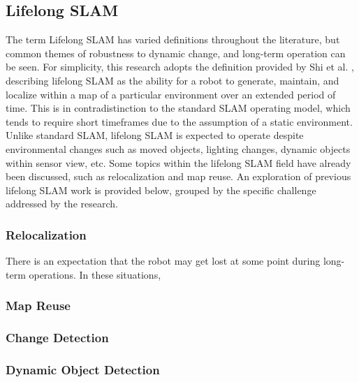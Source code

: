 \subsection{Lifelong SLAM}

The term Lifelong SLAM has varied definitions throughout the literature, but common themes of robustness to dynamic change, and long-term operation can be seen. For simplicity, this research adopts the definition provided by Shi et al. \cite{shiAreWeReady2020}, describing lifelong SLAM as the ability for a robot to generate, maintain, and localize within a map of a particular environment over an extended period of time. This is in contradistinction to the standard SLAM operating model, which tends to require short timeframes due to the assumption of a static environment. Unlike standard SLAM, lifelong SLAM is expected to operate despite environmental changes such as moved objects, lighting changes, dynamic objects within sensor view, etc. Some topics within the lifelong SLAM field have already been discussed, such as relocalization and map reuse. An exploration of previous lifelong SLAM work is provided below, grouped by the specific challenge addressed by the research.

\subsubsection{Relocalization}

There is an expectation that the robot may get lost at some point during long-term operations. In these situations,

\subsubsection{Map Reuse}
\subsubsection{Change Detection}
\subsubsection{Dynamic Object Detection}
